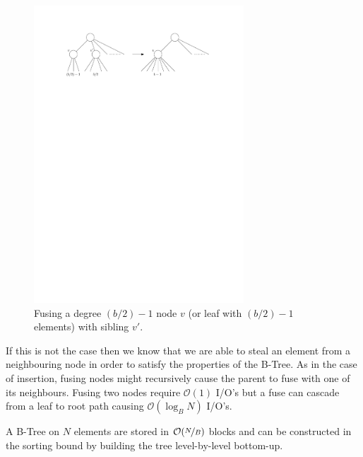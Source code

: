 \documentclass[twoside,11pt,openright]{report}
\begin{document}
\begin{figure}[H]
	\centering
	\includegraphics[width=0.7\textwidth]{../figures/b_tree_fuse}
	\caption{Fusing a degree $(b/2)-1$ node $v$ (or leaf with $(b/2)-1$ elements) with sibling $v'$.}
	\label{fig:b_tree_fuse}
\end{figure}

If this is not the case then we know that we are able to steal an element from a neighbouring node in order to satisfy the properties of the B-Tree. As in the case of insertion, fusing nodes might recursively cause the parent to fuse with one of its neighbours.
Fusing two nodes require $\mathcal{O}(1)$ I/O's but a fuse can cascade from a leaf to root path causing $\mathcal{O}(\log_B N)$ I/O's.

A B-Tree on $N$ elements are stored in $\mathcal{O}(\nicefrac{N}{B})$ blocks and can be constructed in the sorting bound by building the tree level-by-level bottom-up.
\end{document}

